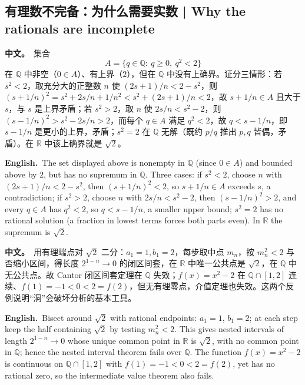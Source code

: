 \documentclass[UTF8,11pt,a4paper]{ctexart}
\newcommand{\R}{\mathbb{R}}
\newcommand{\Q}{\mathbb{Q}}
\newcommand{\BOTH}[2]{\par\noindent\textbf{中文。}\ #1\par\noindent\textbf{English.}\ #2\par}
\begin{document}
\subsection{有理数不完备：为什么需要实数 | Why the rationals are incomplete}
\BOTH{集合
\[
A=\{q\in\Q:\ q\ge0,\ q^2<2\}
\]
在 $\Q$ 中非空（$0\in A$）、有上界（$2$），但在 $\Q$ 中没有上确界。证分三情形：若 $s^2<2$，取充分大的正整数 $n$ 使 $(2s+1)/n<2-s^2$，则 $(s+1/n)^2=s^2+2s/n+1/n^2<s^2+(2s+1)/n<2$，故 $s+1/n\in A$ 且大于 $s$，与 $s$ 是上界矛盾；若 $s^2>2$，取 $n$ 使 $2s/n<s^2-2$，则 $(s-1/n)^2>s^2-2s/n>2$，而每个 $q\in A$ 满足 $q^2<2$，故 $q<s-1/n$，即 $s-1/n$ 是更小的上界，矛盾；$s^2=2$ 在 $\Q$ 无解（既约 $p/q$ 推出 $p,q$ 皆偶，矛盾）。在 $\R$ 中该上确界就是 $\sqrt2$。}{The set displayed above is nonempty in $\Q$ (since $0\in A$) and bounded above by $2$, but has no supremum in $\Q$. Three cases: if $s^2<2$, choose $n$ with $(2s+1)/n<2-s^2$, then $(s+1/n)^2<2$, so $s+1/n\in A$ exceeds $s$, a contradiction; if $s^2>2$, choose $n$ with $2s/n<s^2-2$, then $(s-1/n)^2>2$, and every $q\in A$ has $q^2<2$, so $q<s-1/n$, a smaller upper bound; $s^2=2$ has no rational solution (a fraction in lowest terms forces both parts even). In $\R$ the supremum is $\sqrt2$.}
\BOTH{用有理端点对 $\sqrt2$ 二分：$a_1=1,b_1=2$，每步取中点 $m_n$，按 $m_n^2<2$ 与否缩小区间，得长度 $2^{1-n}\to0$ 的闭区间套，在 $\R$ 中唯一公共点是 $\sqrt2$，在 $\Q$ 中无公共点。故 Cantor 闭区间套定理在 $\Q$ 失效；$f(x)=x^2-2$ 在 $\Q\cap[1,2]$ 连续、$f(1)=-1<0<2=f(2)$，但无有理零点，介值定理也失效。这两个反例说明“洞”会破坏分析的基本工具。}{Bisect around $\sqrt2$ with rational endpoints: $a_1=1$, $b_1=2$; at each step keep the half containing $\sqrt2$ by testing $m_n^2<2$. This gives nested intervals of length $2^{1-n}\to0$ whose unique common point in $\R$ is $\sqrt2$, with no common point in $\Q$; hence the nested interval theorem fails over $\Q$. The function $f(x)=x^2-2$ is continuous on $\Q\cap[1,2]$ with $f(1)=-1<0<2=f(2)$, yet has no rational zero, so the intermediate value theorem also fails.}
\end{document}
